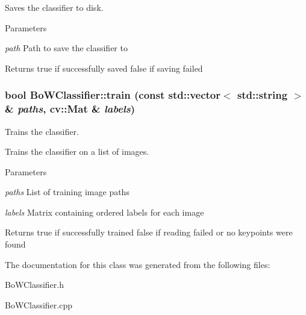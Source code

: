 Saves the classifier to disk. 


\begin{DoxyParams}{Parameters}
\item[{\em path}]Path to save the classifier to \end{DoxyParams}
\begin{DoxyReturn}{Returns}
true if successfully saved false if saving failed 
\end{DoxyReturn}
\hypertarget{classBoWClassifier_a895b3766f5600533aa08632e42653dcb}{
\subsubsection[{train}]{\setlength{\rightskip}{0pt plus 5cm}bool BoWClassifier::train (const std::vector$<$ std::string $>$ \& {\em paths}, \/  cv::Mat \& {\em labels})}}
\label{classBoWClassifier_a895b3766f5600533aa08632e42653dcb}


Trains the classifier. 

Trains the classifier on a list of images.


\begin{DoxyParams}{Parameters}
\item[{\em paths}]List of training image paths \item[{\em labels}]Matrix containing ordered labels for each image \end{DoxyParams}
\begin{DoxyReturn}{Returns}
true if successfully trained false if reading failed or no keypoints were found 
\end{DoxyReturn}


The documentation for this class was generated from the following files:\begin{DoxyCompactItemize}
\item 
BoWClassifier.h\item 
BoWClassifier.cpp\end{DoxyCompactItemize}
